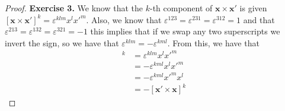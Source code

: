 \documentclass[11pt]{article}
\theoremstyle{definition}
\begin{document}
\begin{proof}{\textbf{Exercise 3.}}
    We know that the $k$-th component of $\bm{x} \times \bm{x}'$ is given 
    $[\bm{x} \times \bm{x}']^k = \varepsilon^{klm}x^lx'^m$. Also, we know
    that $\varepsilon^{123} = \varepsilon^{231} = \varepsilon^{312} = 1$
    and that $\varepsilon^{213} = \varepsilon^{132} = \varepsilon^{321} = -1$
    this implies that if we swap any two superscripts we invert
    the sign, so we have that $\varepsilon^{klm} = -\varepsilon^{kml}$.
    From this, we have that
    \begin{align*}
        [\bm{x} \times \bm{x}']^k &= \varepsilon^{klm}x^l x'^m\\
            &= -\varepsilon^{kml}x^l x'^m\\
            &= -\varepsilon^{kml}x'^m x^l\\
            &= -[\bm{x}' \times \bm{x}]^k
    \end{align*}
\end{proof}
\cleardoublepage
\end{document}

